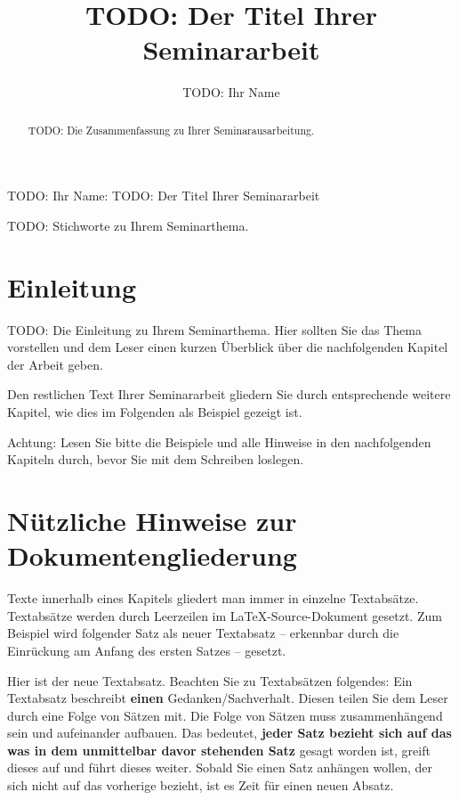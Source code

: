 \documentclass[a4paper,twoside]{IEEEtran}
\newcommand{\seminarteilnehmer}{TODO: Ihr Name}
\newcommand{\seminartitel}{TODO: Der Titel Ihrer Seminararbeit}
\begin{document}
\title{\seminartitel}
\author{\seminarteilnehmer}

%
{\seminarteilnehmer: \seminartitel}

\maketitle

\begin{abstract}
TODO: Die Zusammenfassung zu Ihrer Seminarausarbeitung.
\end{abstract}

\begin{IEEEkeywords}
TODO: Stichworte zu Ihrem Seminarthema.
\end{IEEEkeywords}


\section{Einleitung}
TODO: Die Einleitung zu Ihrem Seminarthema. Hier sollten Sie das Thema vorstellen und dem Leser einen kurzen Überblick über die nachfolgenden Kapitel der Arbeit geben.

Den restlichen Text Ihrer Seminararbeit gliedern Sie durch entsprechende weitere Kapitel, wie dies im Folgenden als Beispiel gezeigt ist.

Achtung: Lesen Sie bitte die Beispiele und alle Hinweise in den nachfolgenden Kapiteln durch, bevor Sie mit dem Schreiben loslegen. 


\section{Nützliche Hinweise zur Dokumentengliederung} 
Texte innerhalb eines Kapitels gliedert man immer in einzelne Textabsätze. Textabsätze werden durch Leerzeilen im LaTeX-Source-Dokument gesetzt. Zum Beispiel wird folgender Satz als neuer Textabsatz -- erkennbar durch die Einrückung am Anfang des ersten Satzes -- gesetzt.

Hier ist der neue Textabsatz. Beachten Sie zu Textabsätzen folgendes: Ein Textabsatz beschreibt \textbf{einen} Gedanken/Sachverhalt. Diesen teilen Sie dem Leser durch eine Folge von Sätzen mit. Die Folge von Sätzen muss zusammenhängend sein und aufeinander aufbauen. Das bedeutet, \textbf{jeder Satz bezieht sich auf das was in dem unmittelbar davor stehenden Satz} gesagt worden ist, greift dieses auf und führt dieses weiter. Sobald Sie einen Satz anhängen wollen, der sich nicht auf das vorherige bezieht, ist es Zeit für einen neuen Absatz.
\end{document}
